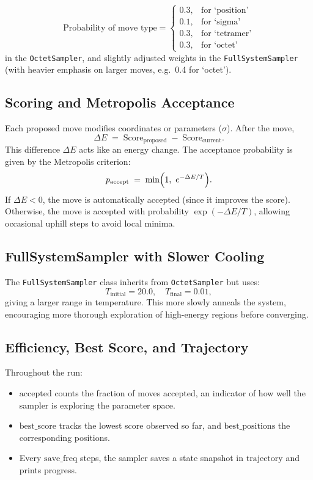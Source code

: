 \documentclass[12pt]{article}
\begin{document}
\[
    \text{Probability of move type} =
    \begin{cases}
        0.3,& \text{for `position'} \\
        0.1,& \text{for `sigma'} \\
        0.3,& \text{for `tetramer'} \\
        0.3,& \text{for `octet'} 
    \end{cases}
\]
in the \texttt{OctetSampler}, and slightly adjusted weights in the \texttt{FullSystemSampler} (with heavier emphasis on larger moves, e.g.\ 0.4 for `octet').

\subsection{Scoring and Metropolis Acceptance}
Each proposed move modifies coordinates or parameters (\(\sigma\)). After the move,
\[
    \Delta E \;=\;
        \text{Score}_{\text{proposed}} \;-\;
        \text{Score}_{\text{current}}.
\]
This difference \(\Delta E\) acts like an energy change. The acceptance probability is given by the Metropolis criterion:
\[
    p_\mathrm{accept} \;=\; \min \Bigl(1,\ e^{-\Delta E / T}\Bigr).
\]
If \(\Delta E < 0\), the move is automatically accepted (since it improves the score). Otherwise, the move is accepted with probability \(\exp(-\Delta E / T)\), allowing occasional uphill steps to avoid local minima.

\subsection{FullSystemSampler with Slower Cooling}
The \texttt{FullSystemSampler} class inherits from \texttt{OctetSampler} but uses:
\[
    T_{\mathrm{initial}} = 20.0,\quad
    T_{\mathrm{final}} = 0.01,
\]
giving a larger range in temperature. This more slowly anneals the system, encouraging more thorough exploration of high-energy regions before converging.

\subsection{Efficiency, Best Score, and Trajectory}
Throughout the run:
\begin{itemize}
    \item \(\mathrm{accepted}\) counts the fraction of moves accepted, an indicator of how well the sampler is exploring the parameter space.
    \item \(\mathrm{best\_score}\) tracks the lowest score observed so far, and \(\mathrm{best\_positions}\) the corresponding positions.
    \item Every \(\mathrm{save\_freq}\) steps, the sampler saves a state snapshot in \(\mathrm{trajectory}\) and prints progress. 
\end{itemize}
\end{document}
